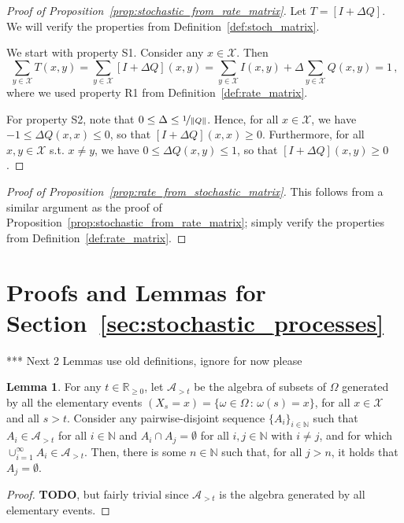 \documentclass[10pt]{paper}
\theoremstyle{definition}
\newtheorem{lemma}[theorem]{Lemma}
\newcommand{\nats}{\mathbb{N}}
\newcommand{\reals}{\mathbb{R}}
\newcommand{\realsnonneg}{\reals_{\geq 0}}
\newcommand{\states}{\mathcal{X}}
\newcommand{\norm}[1]{\left\lVert #1 \right\rVert}
\begin{document}
\begin{proof}[Proof of Proposition~\ref{prop:stochastic_from_rate_matrix}]
Let $T=[I+\Delta Q]$. We will verify the properties from Definition~\ref{def:stoch_matrix}.

We start with property S1. Consider any $x\in\states$. Then
\begin{equation*}
\sum_{y\in\states} T(x,y) = \sum_{y\in\states} [I + \Delta Q](x,y) = \sum_{y\in\states}I(x,y) + \Delta \sum_{y\in\states}Q(x,y) = 1\,,
\end{equation*}
where we used property R1 from Definition~\ref{def:rate_matrix}.

For property S2, note that $0\leq \Delta \leq \nicefrac{1}{\norm{Q}}$. Hence, for all $x\in\states$, we have $-1\leq \Delta Q(x,x) \leq 0$, so that $[I+\Delta Q](x,x) \geq 0$. Furthermore, for all $x,y\in\states$ s.t. $x\neq y$, we have $0\leq \Delta Q(x,y) \leq 1$, so that $[I+\Delta Q](x,y)\geq 0$.
\end{proof}

\begin{proof}[Proof of Proposition~\ref{prop:rate_from_stochastic_matrix}]
This follows from a similar argument as the proof of Proposition~\ref{prop:stochastic_from_rate_matrix}; simply verify the properties from Definition~\ref{def:rate_matrix}.
\end{proof}

\section{Proofs and Lemmas for Section~\ref{sec:stochastic_processes}}

*** Next 2 Lemmas use old definitions, ignore for now please

\begin{lemma}
For any $t\in\realsnonneg$, let $\mathcal{A}_{>t}$ be the algebra of subsets of $\Omega$ generated by all the elementary events $(X_s=x)= \{\omega\in\Omega\,:\,\omega(s)=x\}$, for all $x\in\states$ and all $s>t$. Consider any pairwise-disjoint sequence $\{A_i\}_{i\in\nats}$ such that $A_i\in\mathcal{A}_{>t}$ for all $i\in\nats$ and $A_i\cap A_j=\emptyset$ for all $i,j\in\nats$ with $i\neq j$, and for which $\cup_{i=1}^\infty A_i\in\mathcal{A}_{>t}$. Then, there is some $n\in\nats$ such that, for all $j>n$, it holds that $A_j=\emptyset$.
\end{lemma}
\begin{proof}
{\bf TODO}, but fairly trivial since $\mathcal{A}_{>t}$ is the algebra generated by all elementary events.
\end{proof}
\end{document}
